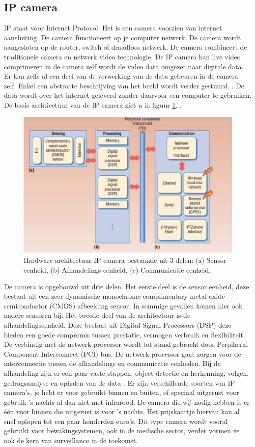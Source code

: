 \subsection{IP camera}
\label{refIPC}
IP staat voor Internet Protocol. Het is een camera voorzien van internet aansluiting. De camera functioneert op je computer netwerk. De camera wordt aangesloten op de router, switch of draadloos netwerk.  De camera combineert de traditionele camera en netwerk video technologie. De IP camera kan live video comprimeren in de camera zelf wordt de video data omgezet naar digitale data. Er kan zelfs al een deel van de verwerking van de data gebeuren in de camera zelf. Enkel een abstracte beschrijving van het beeld wordt verder gestuurd. \cite{bibIPC3}.  De data wordt over het internet geleverd zonder daarvoor een computer te gebruiken. De basis archtiectuur van de IP camera ziet u in figuur \ref{imgIPC}. \cite{bibVTC2}.
\begin{figure}[h]
	\includegraphics[scale=0.55]{ArchitectuurIPCamera}
	\caption{Hardware architectuur IP camera bestaande uit 3 delen: (a) Sensor eenheid, (b) Afhandelings eenheid, (c) Communicatie eenheid.}
	\label{imgIPC}
\end{figure}
De camera is opgebouwd uit drie delen. Het eerste deel is de sensor eenheid, deze bestaat uit een zeer dynamische monochrome complimentary metal-oxide semiconductor (CMOS) afbeelding sensor. In sommige gevallen komen hier ook andere sensoren bij. Het tweede deel van de architectuur is de afhandelingseenheid. Deze bestaat uit Digital Signal Processors (DSP) deze bieden een goede compromis tussen prestatie, vermogen verbruik en flexibiliteit.  De verbindig met de netwerk processor wordt tot stand gebracht door Perpiheral Component Interconnect (PCI) bus. De netwerk processor gaat zorgen voor de interconnectie tussen de afhandelings en communicatie eenheden. Bij de afhandeling zijn er een paar vaste stappen: object detectie en herkenning, volgen, gedragsanalyse en ophalen van de data \cite{bibIPC2}. Er zijn verschillende soorten van IP camera's, je hebt er voor gebruikt binnen en buiten, of speciaal uitgerust voor gebruik 's nachts al dan niet met infrarood. De camera die wij nodig hebben is er \'e\'en voor binnen die uitgerust is voor 's nachts. Het prijskaartje hiervan kan al snel oplopen tot een paar honderden euro's. Dit type camera wordt vooral gebruikt voor bewakingsystemen, ook in de medische sector, verder vormen ze ook de kern van surveillance in de toekomst. 

